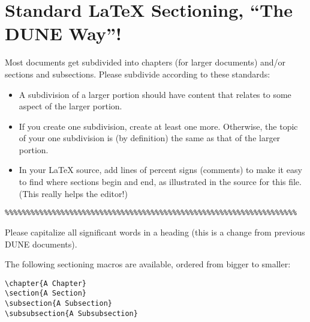 \section{Standard \LaTeX{} Sectioning, ``The DUNE Way''!}
\label{sec:latex-sectioning}

Most documents get subdivided into chapters (for larger documents) and/or sections and subsections. Please subdivide according to these standards:

\begin{itemize}
\item A subdivision of a larger portion should have content that relates to some aspect of the larger portion. 
\item  If you create one subdivision, create at least one more. Otherwise, the topic of your one subdivision is (by definition) the same as that of the larger portion.
\item In your \LaTeX{} source, add lines of percent signs (comments) to make it easy to find where sections begin and end, as illustrated in the source for this file. (This really helps the editor!)
\end{itemize}

\begin{verbatim}
%%%%%%%%%%%%%%%%%%%%%%%%%%%%%%%%%%%%%%%%%%%%%%%%%%%%%%%%%%%%%%%%%%%%
\end{verbatim}

Please capitalize all significant words in a heading (this is a change from 
previous DUNE documents).

The following sectioning macros are available, ordered from bigger to smaller:

\begin{verbatim}
\chapter{A Chapter}
\section{A Section}
\subsection{A Subsection}
\subsubsection{A Subsubsection}
\end{verbatim}

